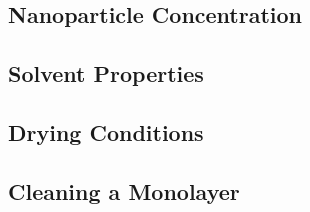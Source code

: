 \documentclass[\main/dresen_thesis.tex]{subfiles}
\renewcommand{\thisPath}{\main/chapters/monolayers/preparationMonolayers}
\begin{document}
  

  \subsection{Nanoparticle Concentration}
    

    \subsection{Solvent Properties}
    
    \FloatBarrier

  \subsection{Drying Conditions}
    

    \subsection{Cleaning a Monolayer}
    
  \FloatBarrier
\end{document}
